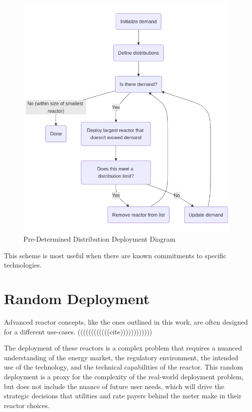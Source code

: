 \begin{figure}[!htbp]
    \centering
    \includegraphics[scale=0.4]{images/schemes/pre_det_diagram.png}
    \caption{Pre-Determined Distribution Deployment Diagram}
    \label{fig:pre_det_diagram}
\end{figure}


This scheme is most useful when there are known commitments to specific technologies.

\section{Random Deployment}

Advanced reactor concepts, like the ones outlined in this work, are often designed for a different use-cases. ((((((((((((cite))))))))))))


The deployment of these reactors is a complex problem that requires a nuanced
understanding of the energy market, the regulatory environment, the intended
use of the technology, and the technical capabilities of the reactor. This
random deployment is a proxy for the complexity of the real-world deployment
problem, but does not include the nuance of future user needs, which will drive
the strategic decisions that utilities and rate payers behind the meter make in
their reactor choices.


